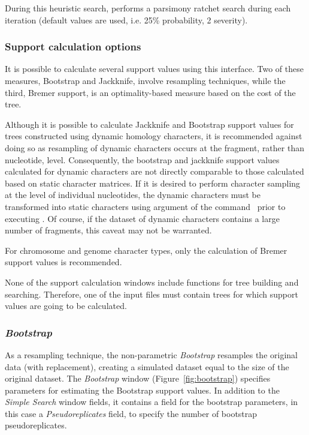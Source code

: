 {During this heuristic search, \poy performs a parsimony ratchet search during each iteration (default values are used, 
i.e. 25\% probability, 2 severity).

\subsubsection{Support calculation options}

It is possible to calculate several support values using this interface.  Two of these measures, Bootstrap and 
Jackknife, involve resampling techniques, while the third, Bremer support, is an optimality-based measure based 
on the cost of the tree. 

Although it is possible to calculate Jackknife and Bootstrap support values for trees constructed using dynamic homology 
characters, it is recommended against doing so as resampling of dynamic characters occurs at the 
fragment, rather than nucleotide, level. Consequently, the bootstrap and jackknife support values
calculated for dynamic characters are not directly comparable to those calculated based on static 
character matrices. If it is desired to perform character sampling at the level of individual nucleotides, 
the dynamic characters must be transformed into static characters using 
argument of the command~ prior to executing .
Of course, if the dataset of dynamic characters contains a large number of fragments, this caveat may not be warranted.

For chromosome and genome character types, only the calculation of Bremer support values is recommended.

None of the support calculation windows include functions for tree building and searching. Therefore, one of the 
input files must contain trees for which support values are going to be calculated.

\subsubsection*{\emph{Bootstrap}}

As a resampling technique, the non-parametric \emph{Bootstrap} resamples the original data (with replacement), 
creating a simulated dataset equal to the size of the original dataset. The \emph{Bootstrap} window 
(Figure~\ref{fig:bootstrap}) specifies parameters for estimating the Bootstrap support values. In addition to the 
\emph{Simple Search} window fields, it contains a field for the bootstrap parameters, in this case a 
\emph{Pseudoreplicates} field, to specify the number of bootstrap pseudoreplicates.

}
